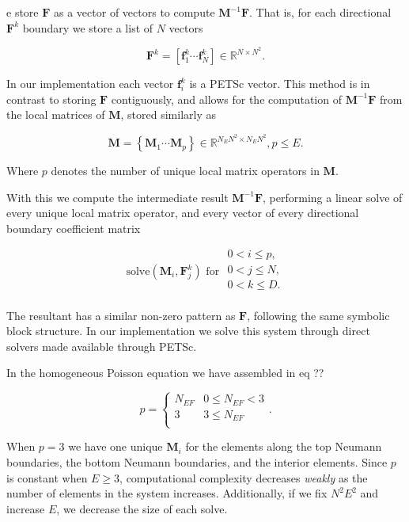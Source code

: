 e store $\textbf{F}$ as a vector of vectors to compute $\textbf{M}^{-1}\textbf{F}$. That is, for each directional $\textbf{F}^k$ boundary we store a list of $N$ vectors

\begin{equation}
    \textbf{F}^k = \left[\textbf{f}^k_1 \cdots \textbf{f}^k_N\right] \in \mathbb{R}^{N \times N^2}.
\end{equation} 

\noindent
In our implementation each vector $\textbf{f}^k_i$ is a PETSc vector. This method is in contrast to storing $\textbf{F}$ contiguously, and allows for the computation of $\textbf{M}^{-1}\textbf{F}$ from the local matrices of $\textbf{M}$, stored similarly as

\begin{equation}
    \textbf{M} = \left\{\textbf{M}_1 \cdots \textbf{M}_p\right\} \in \mathbb{R}^{N_{E}N^2 \times N_{E}N^2}, p \leq E.
\end{equation} 

\noindent 
Where $p$ denotes the number of unique local matrix operators in $\textbf{M}$. 

With this we compute the intermediate result $\textbf{M}^{-1}\textbf{F}$, performing a linear solve of every unique local matrix operator, and every vector of every directional boundary coefficient matrix 

\begin{equation}
    \text{solve}(\textbf{M}_{i}, \textbf{F}^{k}_j) \text{  for }
    \begin{array}{l}
        0 < i \leq p, \\
        0 < j \leq N, \\
        0 < k \leq D. \\ 
    \end{array}
\end{equation}

\noindent
The resultant has a similar non-zero pattern as $\textbf{F}$, following the same symbolic block structure. In our implementation we solve this system through direct solvers made available through PETSc. 

\begin{aside}
    In the homogeneous Poisson equation we have assembled in 
    eq {\color{red} ?? } 

    \begin{equation}
        p = \begin{cases}
            N_{EF} &  0 \leq N_{EF} < 3 \\ 
            3 &  3 \leq N_{EF} \\ 
        \end{cases}.
    \end{equation} 

    \noindent 
    When $p = 3$ we have one unique $\textbf{M}_i$ for the elements 
    along the top Neumann boundaries, the bottom Neumann boundaries, 
    and the interior elements. Since $p$ is constant when 
    $E \geq 3$, computational complexity decreases \emph{weakly} 
    as the number of elements in the system increases. Additionally, 
    if we fix $N^2E^2$ and increase $E$, we decrease the size of 
    each solve.
\end{aside}

